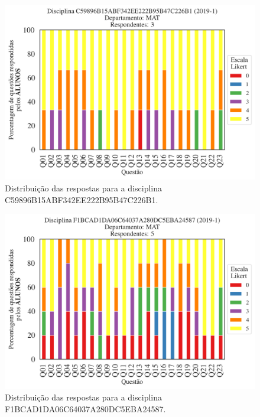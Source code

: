 \documentclass[a4paper,10pt]{article}
\begin{document}
\begin{figure}[h]
\centering
\includegraphics[width=0.485\linewidth]{analise_disciplina_departamento_MAT_ALUNO_TURMA_C59896B15ABF342EE222B95B47C226B1.png}
\caption{\label{fig:analise_geral_departamento}                Distribuição das respostas para a disciplina C59896B15ABF342EE222B95B47C226B1.}
\end{figure}
\begin{figure}[h]
\centering
\includegraphics[width=0.485\linewidth]{analise_disciplina_departamento_MAT_ALUNO_TURMA_F1BCAD1DA06C64037A280DC5EBA24587.png}
\caption{\label{fig:analise_geral_departamento}                Distribuição das respostas para a disciplina F1BCAD1DA06C64037A280DC5EBA24587.}
\end{figure}
\end{document}
